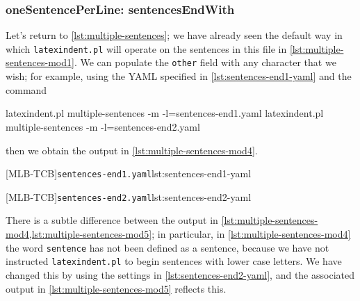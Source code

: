 \subsubsection{oneSentencePerLine: sentencesEndWith}
 \begin{example}
 Let's return to \vref{lst:multiple-sentences}; we have already seen the default way in
 which \texttt{latexindent.pl} will operate on the sentences in this file in
 \vref{lst:multiple-sentences-mod1}. We can populate the \texttt{other} field with any
 character that we wish; for example, using the YAML specified in
 \cref{lst:sentences-end1-yaml} and the command 
  

 \begin{commandshell}
latexindent.pl multiple-sentences -m -l=sentences-end1.yaml
latexindent.pl multiple-sentences -m -l=sentences-end2.yaml
\end{commandshell}

 then we obtain the output in \cref{lst:multiple-sentences-mod4}. 

 \begin{cmhtcbraster}
  [MLB-TCB]{\texttt{sentences-end1.yaml}}{lst:sentences-end1-yaml}
 \end{cmhtcbraster}

 \begin{cmhtcbraster}
  [MLB-TCB]{\texttt{sentences-end2.yaml}}{lst:sentences-end2-yaml}
 \end{cmhtcbraster}

 There is a subtle difference between the output in
 \cref{lst:multiple-sentences-mod4,lst:multiple-sentences-mod5}; in particular, in
 \cref{lst:multiple-sentences-mod4} the word \texttt{sentence} has not been defined as a
 sentence, because we have not instructed \texttt{latexindent.pl} to begin sentences with
 lower case letters. We have changed this by using the settings in
 \cref{lst:sentences-end2-yaml}, and the associated output in
 \cref{lst:multiple-sentences-mod5} reflects this.
 \end{example}


